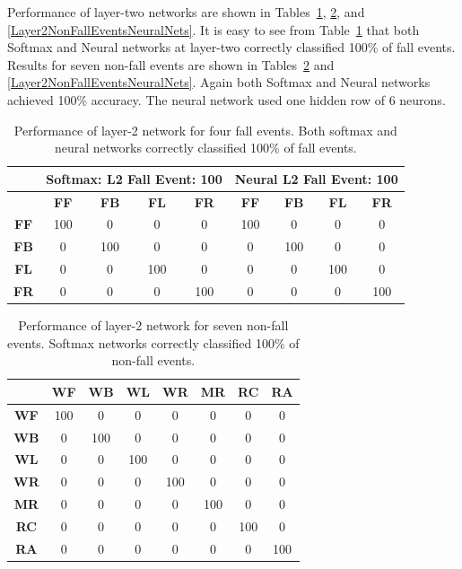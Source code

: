 \documentclass{IEEEtran}
\begin{document}
Performance of layer-two networks are shown in Tables~\ref{Layer2FallEvents}, \ref{Layer2NonFallEventsSoftmax}, and \ref{Layer2NonFallEventsNeuralNets}. It is easy to see from Table~\ref{Layer2FallEvents} that both Softmax and Neural networks at layer-two correctly classified 100\% of fall events.
Results for seven non-fall events are shown in Tables~\ref{Layer2NonFallEventsSoftmax} and 
\ref{Layer2NonFallEventsNeuralNets}. Again both Softmax and Neural networks achieved 100\% accuracy. The neural network used one hidden row of 6 neurons.
\begin{table}[htb]
\resizebox{\columnwidth}{!}
{
\begin{tabular}{|c|c|c|c|c||c|c|c|c|}
\hline 
& \multicolumn{4}{c||}{\bf Softmax: L2 Fall Event: 100} & \multicolumn{4}{c|}{\bf Neural 
L2 Fall Event: 100} \\ \hline
& \textbf{FF} & \textbf{FB}  & \textbf{FL} & \textbf{FR} & \textbf{FF} & \textbf{FB}  & 
\textbf{FL} & \textbf{FR} \\ \hline
\textbf{FF} & 100 &  0 &  0 &  0  & 100 &  0 &  0 &  0\\ \hline
\textbf{FB} & 0 &  100 &  0 &  0  & 0 &  100 &  0 &  0\\ \hline
\textbf{FL} & 0 &  0 &  100 &  0  & 0 &  0 &  100 &  0\\ \hline
\textbf{FR} & 0 &  0 &  0 &  100  & 0 &  0 &  0 &  100 \\ \hline
\end{tabular}
}
\caption{ Performance of layer-2 network for  four fall events. Both softmax and neural networks correctly classified 100\% of fall events.}
\label{Layer2FallEvents}
\end{table}



\begin{table}[htb]
\caption{Performance of layer-2 network for  seven non-fall events. Softmax networks correctly classified 100\% of non-fall events.}
\label{Layer2NonFallEventsSoftmax}
{
\begin{tabular}{|c|c|c|c|c|c|c|c|}
\hline 
 & \textbf{WF} & \textbf{WB} & \textbf{WL} & \textbf{WR} & \textbf{MR} & 
\textbf{RC} & \textbf{RA} \\ \hline    
\textbf{WF} & 100 &  0 &  0 &  0 &  0 &  0 &  0 \\ \hline
\textbf{WB} & 0 &  100 &  0 &  0 &  0 &  0 &  0 \\ \hline
\textbf{WL} & 0 &  0 &  100 &  0 &  0 &  0 &  0 \\ \hline
\textbf{WR} & 0 &  0 &  0 &  100 &  0 &  0 &  0 \\ \hline
\textbf{MR} & 0 &  0 &  0 &  0 &  100 &  0 &  0 \\ \hline
\textbf{RC} & 0 &  0 &  0 &  0 &  0 &  100 &  0 \\ \hline
\textbf{RA} & 0 &  0 &  0 &  0 &  0 &  0 &  100 \\ \hline
\end{tabular}
}
\end{table}
\end{document}

